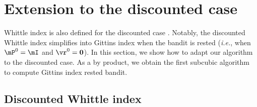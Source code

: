 \section{Extension to the discounted case}
\label{sec:discounted}

Whittle index is also defined for the discounted case \cite{nino2020fast, akbarzadeh2020conditions}. Notably, the discounted Whittle index simplifies into Gittins index when the bandit is rested (\emph{i.e.}, when $\mP^0=\mI$ and $\vr^0=\boldsymbol{0}$). In this section, we show how to adapt our algorithm to the discounted case. As a by product, we obtain the first subcubic algorithm to compute Gittins index rested bandit.

\subsection{Discounted Whittle index}

